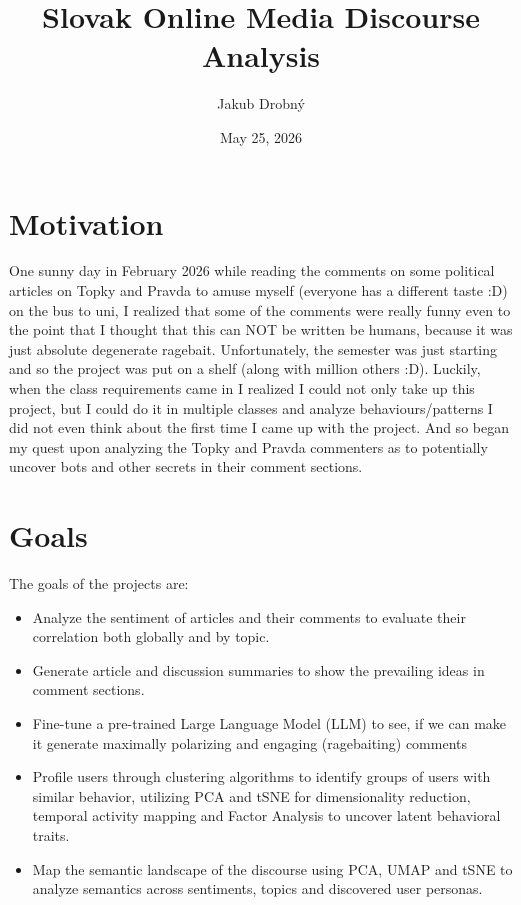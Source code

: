 \documentclass[11pt,a4paper]{article}
\title{Slovak Online Media Discourse Analysis}
\author{Jakub Drobný}
\date{May 25, 2026}
\begin{document}
\maketitle

\section{Motivation}
One sunny day in February 2026 while reading the comments on some political articles on Topky and Pravda to amuse myself (everyone has a different taste :D) on the bus to uni, I realized that some of the comments were really funny even to the point that I thought that this can NOT be written be humans, because it was just absolute degenerate ragebait. Unfortunately, the semester was just starting and so the project was put on a shelf (along with million others :D). Luckily, when the class requirements came in I realized I could not only take up this project, but I could do it in multiple classes and analyze behaviours/patterns I did not even think about the first time I came up with the project. And so began my quest upon analyzing the Topky and Pravda commenters as to potentially uncover bots and other secrets in their comment sections.

\section{Goals} \label{sec:goals}
The goals of the projects are:
\begin{itemize}
	\item Analyze the sentiment of articles and their comments to evaluate their correlation both globally and by topic.
	\item Generate article and discussion summaries to show the prevailing ideas in comment sections.
	\item Fine-tune a pre-trained Large Language Model (LLM) to see, if we can make it generate maximally polarizing and engaging (ragebaiting) comments
	\item Profile users through clustering algorithms to identify groups of users with similar behavior, utilizing PCA and tSNE for dimensionality reduction, temporal activity mapping and Factor Analysis to uncover latent behavioral traits.
	\item Map the semantic landscape of the discourse using PCA, UMAP and tSNE to analyze semantics across sentiments, topics and discovered user personas.
\end{itemize}
\end{document}

